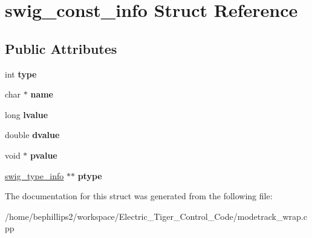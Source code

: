 \hypertarget{structswig__const__info}{\section{swig\-\_\-const\-\_\-info Struct Reference}
\label{structswig__const__info}
}
\subsection*{Public Attributes}
\begin{DoxyCompactItemize}
\item 
\hypertarget{structswig__const__info_ae8bbc99e1cda11f24e306365cbf33893}{int {\bfseries type}}\label{structswig__const__info_ae8bbc99e1cda11f24e306365cbf33893}

\item 
\hypertarget{structswig__const__info_aad383d74116313cf9a8532e163368050}{char $\ast$ {\bfseries name}}\label{structswig__const__info_aad383d74116313cf9a8532e163368050}

\item 
\hypertarget{structswig__const__info_af142e4c21ad4fe61f6c2624bff034583}{long {\bfseries lvalue}}\label{structswig__const__info_af142e4c21ad4fe61f6c2624bff034583}

\item 
\hypertarget{structswig__const__info_a74e477f1dbf515bcb7e2ef07a1d34c35}{double {\bfseries dvalue}}\label{structswig__const__info_a74e477f1dbf515bcb7e2ef07a1d34c35}

\item 
\hypertarget{structswig__const__info_abbc43512c364bff11fac5961c1155090}{void $\ast$ {\bfseries pvalue}}\label{structswig__const__info_abbc43512c364bff11fac5961c1155090}

\item 
\hypertarget{structswig__const__info_aedd46d173c5b5ed4ee60ad5660233557}{\hyperlink{structswig__type__info}{swig\-\_\-type\-\_\-info} $\ast$$\ast$ {\bfseries ptype}}\label{structswig__const__info_aedd46d173c5b5ed4ee60ad5660233557}

\end{DoxyCompactItemize}


The documentation for this struct was generated from the following file\-:\begin{DoxyCompactItemize}
\item 
/home/bephillips2/workspace/\-Electric\-\_\-\-Tiger\-\_\-\-Control\-\_\-\-Code/modetrack\-\_\-wrap.\-cpp\end{DoxyCompactItemize}
